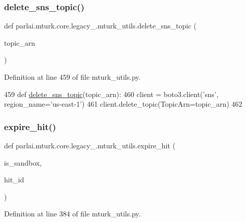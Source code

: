 \subsubsection{\texorpdfstring{delete\+\_\+sns\+\_\+topic()}{delete\_sns\_topic()}}
{\footnotesize\ttfamily def parlai.\+mturk.\+core.\+legacy\+\_.\+mturk\+\_\+utils.\+delete\+\_\+sns\+\_\+topic (\begin{DoxyParamCaption}\item[{}]{topic\+\_\+arn }\end{DoxyParamCaption})}



Definition at line 459 of file mturk\+\_\+utils.\+py.


\begin{DoxyCode}
459 \textcolor{keyword}{def }\hyperlink{namespaceparlai_1_1mturk_1_1core_1_1mturk__utils_a669fa20824749469221df338aa8a0e8e}{delete\_sns\_topic}(topic\_arn):
460     client = boto3.client(\textcolor{stringliteral}{'sns'}, region\_name=\textcolor{stringliteral}{'us-east-1'})
461     client.delete\_topic(TopicArn=topic\_arn)
462 \end{DoxyCode}
\mbox{\label{namespaceparlai_1_1mturk_1_1core_1_1legacy__2018_1_1mturk__utils_a0b52e9d0397e0c856e76b3332987b930}} 
\subsubsection{\texorpdfstring{expire\+\_\+hit()}{expire\_hit()}}
{\footnotesize\ttfamily def parlai.\+mturk.\+core.\+legacy\+\_.\+mturk\+\_\+utils.\+expire\+\_\+hit (\begin{DoxyParamCaption}\item[{}]{is\+\_\+sandbox,  }\item[{}]{hit\+\_\+id }\end{DoxyParamCaption})}



Definition at line 384 of file mturk\+\_\+utils.\+py.


